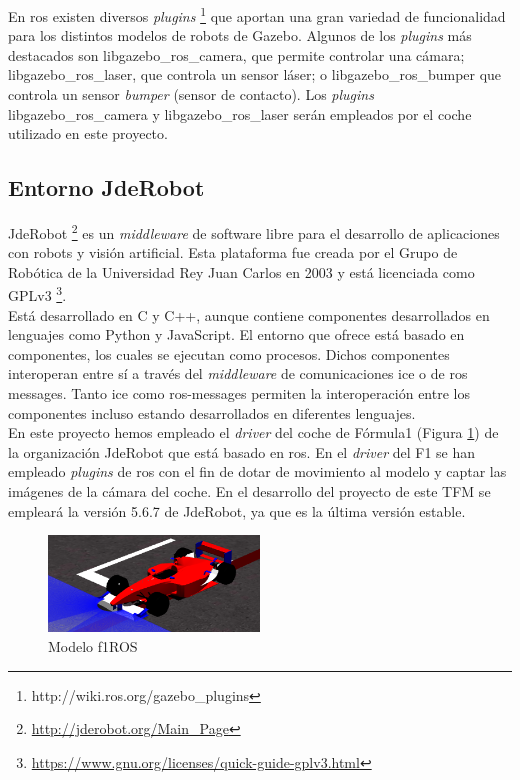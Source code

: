 En \acrshort{ros} existen diversos \textit{plugins} \footnote{http://wiki.ros.org/gazebo\_plugins} que aportan una gran variedad de funcionalidad para los distintos modelos de robots de Gazebo. Algunos de los \textit{plugins} más destacados son libgazebo\_ros\_camera, que permite controlar una cámara; libgazebo\_ros\_laser, que controla un sensor láser; o libgazebo\_ros\_bumper que controla un sensor \textit{bumper} (sensor de contacto). Los \textit{plugins} libgazebo\_ros\_camera y  libgazebo\_ros\_laser serán empleados por el coche utilizado en este proyecto.



\subsection{Entorno JdeRobot}

JdeRobot \footnote{\url{http://jderobot.org/Main_Page}} es un \textit{middleware} de software libre para el desarrollo de aplicaciones con robots y visión artificial. Esta plataforma fue creada por el Grupo de Robótica de la Universidad Rey Juan Carlos en 2003 y está licenciada como GPLv3 \footnote{\url{https://www.gnu.org/licenses/quick-guide-gplv3.html}}.\\

Está desarrollado en C y C++, aunque contiene componentes desarrollados en lenguajes como Python y JavaScript. El entorno que ofrece está basado en componentes, los cuales se ejecutan como procesos. Dichos componentes interoperan entre sí a través del \textit{middleware} de comunicaciones \acrshort{ice} o de \acrshort{ros} messages. Tanto \acrshort{ice} como \acrshort{ros}-messages permiten la interoperación entre los componentes incluso estando desarrollados en diferentes lenguajes.\\

En este proyecto hemos empleado el \textit{driver} del coche de Fórmula1 (Figura \ref{fig.f1}) de la organización JdeRobot que está basado en \acrshort{ros}. En el \textit{driver} del F1 se han empleado \textit{plugins} de \acrshort{ros} con el fin de dotar de movimiento al modelo y captar las imágenes de la cámara del coche. En el desarrollo del proyecto de este TFM se empleará la versión 5.6.7 de JdeRobot, ya que es la última versión estable.


\begin{figure}
  \begin{center}
    \includegraphics[width=0.5\textwidth]{figures/Infraestructura/f1.png}
		\caption{Modelo f1ROS}
		\label{fig.f1}
		\end{center}
\end{figure}



